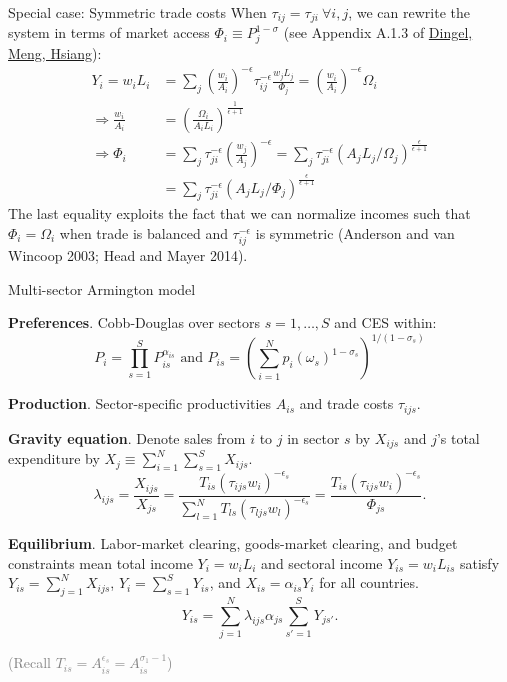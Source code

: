 \documentclass[10pt,notes=hide]{beamer}
\begin{document}
\begin{frame}{Special case: Symmetric trade costs}
When $\tau_{ij} = \tau_{ji} \ \forall i,j$,
we can rewrite the system in terms of market access $\Phi_i \equiv P_j^{1-\sigma}$
(see Appendix A.1.3 of \href{http://www.jdingel.com/research/DingelMengHsiang.pdf}{Dingel, Meng, Hsiang}):
\begin{align*}
Y_i = w_i L_i  	&= \sum_j \left(\frac{w_i}{A_i}\right)^{-\epsilon}\tau_{ij}^{-\epsilon} \frac{w_j L_j}{\Phi_j}
			= \left(\frac{w_i}{A_i}\right)^{-\epsilon} \Omega_i \\
\Rightarrow \frac{w_i}{A_i}	&= \left(\frac{\Omega_i}{A_i L_i}\right)^{\frac{1}{\epsilon+1}} \\
\Rightarrow \Phi_i 	&= \sum_j \tau_{ji}^{-\epsilon} \left(\frac{w_j}{A_j}\right)^{-\epsilon} 
					= \sum_j \tau_{ji}^{-\epsilon} \left(A_j L_j / \Omega_j\right)^{\frac{\epsilon}{\epsilon+1}}\\
					&= \sum_j \tau_{ji}^{-\epsilon} \left(A_j L_j / \Phi_j\right)^{\frac{\epsilon}{\epsilon+1}}
\end{align*}
The last equality exploits the fact that 
we can normalize incomes such that $\Phi_i = \Omega_i$
when trade is balanced and $\tau_{ij}^{-\epsilon}$ is symmetric
(Anderson and van Wincoop 2003; Head and Mayer 2014).
\end{frame}
\begin{frame}{Multi-sector Armington model}
\begin{itemize}{\small
\item \textbf{Preferences}.
Cobb-Douglas over sectors $s = 1, \dots, S$ and CES within:
\begin{equation*}
P_i = \prod_{s=1}^S P_{is}^{\alpha_{is}} \text{ and } P_{is} = \left(\sum_{i=1}^{N} p_i(\omega_s)^{1-\sigma_s} \right)^{1/(1-\sigma_s)}
\end{equation*}
\item \textbf{Production}.
Sector-specific productivities $A_{is}$ and trade costs $\tau_{ijs}$.
\item \textbf{Gravity equation}.
Denote sales from $i$ to $j$ in sector $s$ by $X_{ijs}$ 
and $j$'s total expenditure by $X_j \equiv \sum_{i=1}^{N} \sum_{s=1}^{S} X_{ijs}$.
\begin{equation*}
\lambda_{ijs} = \frac{X_{ijs}}{X_{js}}
= \frac{T_{is} \left(\tau_{ijs}w_i\right)^{-\epsilon_s}}{\sum_{l=1}^{N} T_{ls}  \left(\tau_{ljs}w_l\right)^{-\epsilon_s}}
=\frac{T_{is} \left(\tau_{ijs}w_i\right)^{-\epsilon_s}}{\Phi_{js}}.
\end{equation*}
\item \textbf{Equilibrium}.
Labor-market clearing, goods-market clearing, and budget constraints mean
total income $Y_i = w_i L_i$ and sectoral income $Y_{is} = w_i L_{is}$ satisfy
$Y_{is} = \sum_{j=1}^{N} X_{ijs}$, $Y_i = \sum_{s=1}^{S} Y_{is}$, and $X_{is} = \alpha_{is} Y_i$ for all countries.
\begin{equation*}
	Y_{is} = \sum_{j=1}^{N} \lambda_{ijs} \alpha_{js} \sum_{s'=1}^{S} Y_{js'} .
\end{equation*}
}\end{itemize}
\textcolor{gray}{(Recall $T_{is} = A_{is}^{\epsilon_s} = A_{is}^{\sigma_1 - 1}$)}
\end{frame}
\end{document}
